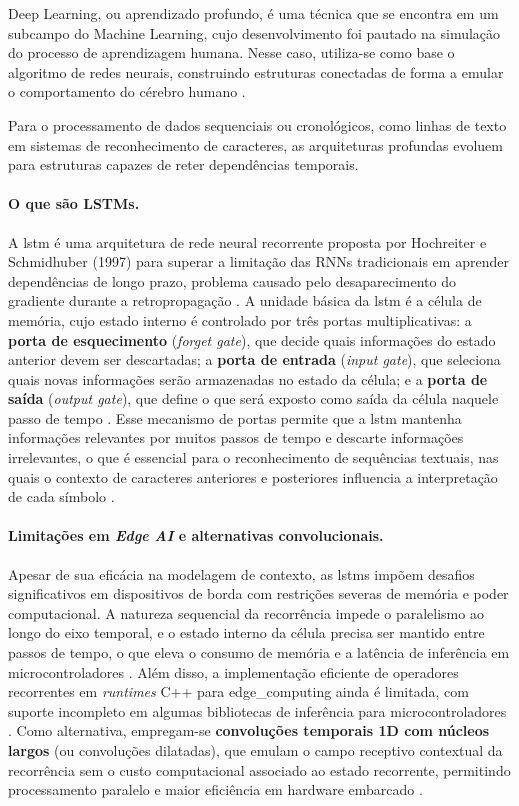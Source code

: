 Deep Learning, ou aprendizado profundo, é uma técnica que se encontra 
em um subcampo do Machine Learning, cujo desenvolvimento foi pautado 
na simulação do processo de aprendizagem humana. 
Nesse caso, utiliza-se como base o algoritmo de redes neurais, 
construindo estruturas conectadas de forma a emular o comportamento do cérebro humano 
\cite{jesus2023inteligencia}.

Para o processamento de dados sequenciais ou cronológicos, como linhas de texto em sistemas de reconhecimento de caracteres, as arquiteturas profundas evoluem para estruturas capazes de reter dependências temporais.

\paragraph{O que são LSTMs.}
A \gls{lstm} é uma arquitetura de rede neural recorrente proposta por Hochreiter e Schmidhuber (1997) para superar a limitação das RNNs tradicionais em aprender dependências de longo prazo, 
problema causado pelo desaparecimento do gradiente durante a retropropagação \cite{hochreiter1997lstm}. 
A unidade básica da \gls{lstm} é a célula de memória, cujo estado interno é controlado por três portas multiplicativas: a \textbf{porta de esquecimento} (\textit{forget gate}), 
que decide quais informações do estado anterior devem ser descartadas; a \textbf{porta de entrada} (\textit{input gate}), 
que seleciona quais novas informações serão armazenadas no estado da célula; e a \textbf{porta de saída} (\textit{output gate}), 
que define o que será exposto como saída da célula naquele passo de tempo \cite{hochreiter1997lstm, hannun2017ctc}. 
Esse mecanismo de portas permite que a \gls{lstm} mantenha informações relevantes por muitos passos de tempo e descarte informações irrelevantes, 
o que é essencial para o reconhecimento de sequências textuais, nas quais o contexto de caracteres anteriores e posteriores influencia a interpretação de cada símbolo \cite{shi2017crnn}.

\paragraph{Limitações em \textit{Edge AI} e alternativas convolucionais.}
Apesar de sua eficácia na modelagem de contexto, as \gls{lstm}s 
impõem desafios significativos em dispositivos de borda com restrições severas de memória e poder computacional. 
A natureza sequencial da recorrência impede o paralelismo ao longo do eixo temporal, 
e o estado interno da célula precisa ser mantido entre passos de tempo, 
o que eleva o consumo de memória e a latência de inferência em microcontroladores \cite{nguyen2026rnn_mcu}. 
Além disso, a implementação eficiente de operadores recorrentes em \textit{runtimes} C++ para \gls{edge_computing} ainda é limitada, 
com suporte incompleto em algumas bibliotecas de inferência para microcontroladores \cite{nguyen2026rnn_mcu}. 
Como alternativa, empregam-se \textbf{convoluções temporais 1D com núcleos largos} (ou convoluções dilatadas), 
que emulam o campo receptivo contextual da recorrência sem o custo computacional associado ao estado recorrente, 
permitindo processamento paralelo e maior eficiência em hardware embarcado \cite{nazre2024tcn, shi2017crnn}.
